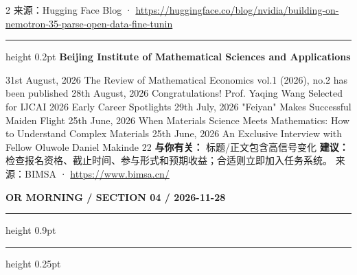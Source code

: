 \documentclass[10.5pt]{ctexart}
\begin{document}
\begin{multicols}{2}
{\footnotesize\color{ormuted} 来源：Hugging Face Blog · \url{https://huggingface.co/blog/nvidia/building-on-nemotron-35-parse-open-data-fine-tunin}}
\vspace{2mm}
\hrule height 0.2pt
\vspace{2mm}
{\large\bfseries Beijing Institute of Mathematical Sciences and Applications}\par
31st August, 2026 The Review of Mathematical Economics vol.1 (2026), no.2 has been published 28th August, 2026 Congratulations! Prof. Yaqing Wang Selected for IJCAI 2026 Early Career Spotlights 29th July, 2026 "Feiyan" Makes Successful Maiden Flight 25th June, 2026 When Materials Science Meets Mathematics: How to Understand Complex Materials 25th June, 2026 An Exclusive Interview with Fellow Oluwole Daniel Makinde 22
\textbf{与你有关：} 标题/正文包含高信号变化
\textbf{建议：} 检查报名资格、截止时间、参与形式和预期收益；合适则立即加入任务系统。
{\footnotesize\color{ormuted} 来源：BIMSA · \url{https://www.bimsa.cn/}}
\end{multicols}
\newpage
{\small\bfseries OR MORNING / SECTION 04 / 2026-11-28}
\vspace{2mm}
\hrule height 0.9pt
\vspace{1.5mm}
\hrule height 0.25pt
\vspace{4mm}
\end{document}
